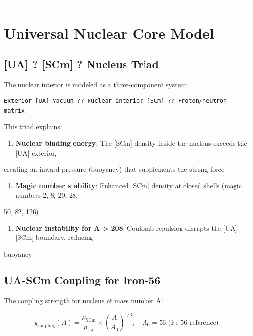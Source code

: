 \documentclass[12pt,a4paper]{article}
\begin{document}
\medskip\hrule\medskip

\section{Universal Nuclear Core Model}

\subsection{{[UA]} ? [SCm] ? Nucleus Triad}

The nuclear interior is modeled as a three-component system:

\begin{verbatim}
Exterior [UA] vacuum ?? Nuclear interior [SCm] ?? Proton/neutron matrix
\end{verbatim}

This triad explains:

\begin{enumerate}
  \item \textbf{Nuclear binding energy}: The [SCm] density inside the nucleus exceeds the [UA] exterior,
\end{enumerate}

creating an inward pressure (buoyancy) that supplements the strong force

\begin{enumerate}
  \item \textbf{Magic number stability}: Enhanced [SCm] density at closed shells (magic numbers 2, 8, 20, 28,
\end{enumerate}

50, 82, 126)

\begin{enumerate}
  \item \textbf{Nuclear instability for A > 208}: Coulomb repulsion disrupts the [UA]-[SCm] boundary, reducing
\end{enumerate}

buoyancy

\subsection{UA-SCm Coupling for Iron-56}

The coupling strength for nucleus of mass number A:

\begin{equation}
g_{\mathrm{coupling}}(A) = \frac{\rho_{\mathrm{SCm}}}{\rho_{\mathrm{UA}}} \times \left(\frac{A}{A_0}\right)^{1/3}, \quad A_0 = 56 \text{ (Fe-56 reference)}
\end{equation}
\end{document}
